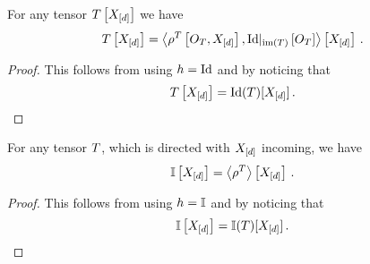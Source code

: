 \begin{corollary}\label{cor:rhoToNormal}
	For any tensor $T\left[X_{[d]}\right]$ we have
	\begin{align*}
		T\left[X_{[d]}\right]
		= \left\langle \rho^{T}\left[O_{T},X_{[d]}\right],{\mathrm{Id}}|_{\mathrm{im}\left(T\right)}\left[O_{T}\right]\right\rangle \left[ X_{[d]} \right] \, .
	\end{align*}
\end{corollary}
\begin{proof}
	This follows from  using $h=\mathrm{Id}$ and by noticing that
	\begin{align*}
		T\left[X_{[d]}\right] = \mathrm{Id}(T)[X_{[d]}] \, .
	\end{align*}
\end{proof}

\begin{corollary}\label{cor:onesHead}
	For any tensor $T$, which is directed with $X_{[d]}$ incoming, we have
		\[ \mathbb{I}\left[X_{[d]}\right] = \left\langle \rho^{T}\right\rangle \left[ X_{[d]} \right] \, . \]
\end{corollary}
\begin{proof}
	This follows from  using $h=\mathbb{I}$ and by noticing that
	\begin{align*}
		\mathbb{I}\left[X_{[d]}\right] = \mathbb{I}(T)[X_{[d]}] \, .
	\end{align*}
\end{proof}


